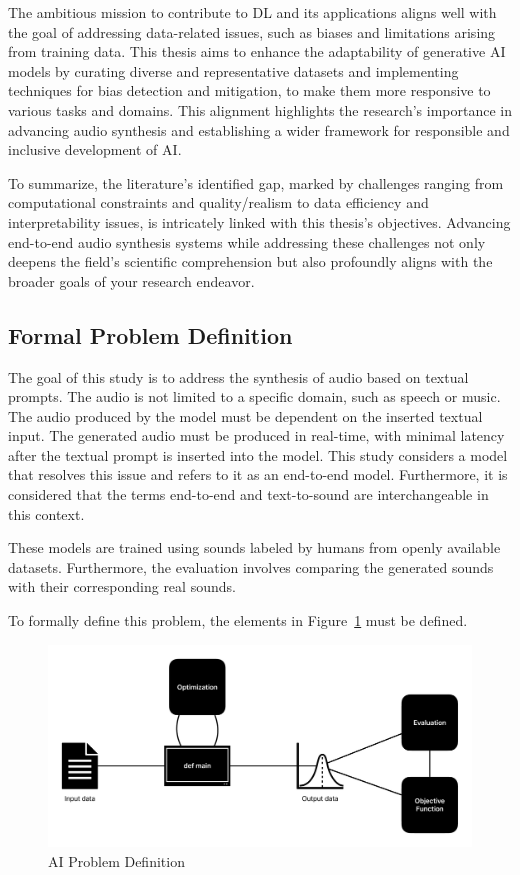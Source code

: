 The ambitious mission to contribute to \ac{DL} and its applications aligns well with the goal of addressing data-related issues, such as biases and limitations arising from training data. This thesis aims to enhance the adaptability of generative \ac{AI} models by curating diverse and representative datasets and implementing techniques for bias detection and mitigation, to make them more responsive to various tasks and domains. This alignment highlights the research's importance in advancing audio synthesis and establishing a wider framework for responsible and inclusive development of \ac{AI}.

To summarize, the literature's identified gap, marked by challenges ranging from computational constraints and quality/realism to data efficiency and interpretability issues, is intricately linked with this thesis's objectives. Advancing end-to-end audio synthesis systems while addressing these challenges not only deepens the field's scientific comprehension but also profoundly aligns with the broader goals of your research endeavor.

\subsection{Formal Problem Definition}

The goal of this study is to address the synthesis of audio based on textual prompts. The audio is not limited to a specific domain, such as speech or music. The audio produced by the model must be dependent on the inserted textual input. The generated audio must be produced in real-time, with minimal latency after the textual prompt is inserted into the model. This study considers a model that resolves this issue and refers to it as an end-to-end model. Furthermore, it is considered that the terms end-to-end and text-to-sound are interchangeable in this context.

These models are trained using sounds labeled by humans from openly available datasets. Furthermore, the evaluation involves comparing the generated sounds with their corresponding real sounds.

To formally define this problem, the elements in Figure~\ref{fig:problem-definition} must be defined.

\begin{figure}[ht]
    \centering
    \includegraphics[width=\textwidth]{figures/3-problem/Problem-Definition.pdf}
    \caption{AI Problem Definition}
    \label{fig:problem-definition}
\end{figure}

